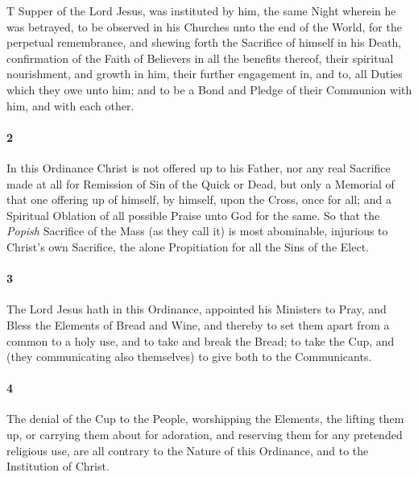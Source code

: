 \documentclass[
    paper=letterpaper,
    11pt,
    twoside,
    DIV=calc,
    openany
]{scrbook}
\makeatletter
\newcommand{\oldgrammar}[2]{#2}
\def\extractfirstletter#1#2@{#1}
\newcommand{\firstlettercommand}[1]{ \extractfirstletter#1@ }
\newcommand{\oldleadin}[2]{\lettrine[ante=\textbf{1},lines=2,lraise=0.1,findent=-0.3em,nindent=0.1em, slope=0em]{\color{red}\firstlettercommand{#2}}{\RemoveFirstLetter{#2}}}
\newcommand{\firstparagraph}{}
\makeatother
\begin{document}
\firstparagraph{} %
\oldleadin{THE}{The} Supper of the Lord Jesus, was instituted by him, the same Night wherein he was betrayed, to be observed in his Churches unto the end of the World, for the perpetual remembrance, and shewing forth the Sacrifice of himself in his Death, \R{}confirmation of the Faith of Believers in all the benefits thereof, their spiritual nourishment, and growth in him, their further \oldgrammar{ingagement}{engagement} in, and to, all Duties which they owe unto him; \R{}and to be a Bond and Pledge of their Communion with him, and with each other.

\footnotebegin
{}
\footnoteend

\paragraph{2} %
In this Ordinance Christ is not offered up to his Father, nor any real Sacrifice made at all for Remission of Sin of the Quick or Dead, but only a Memorial of that \R{}one offering up of himself, by himself, upon the Cross, once for all; and a Spiritual Oblation of all \R{}possible Praise unto God for the same. So that the \textit{Popish} Sacrifice of the Mass (as they call it) is most abominable, injurious to Christ’s own Sacrifice, the alone Propitiation for all the Sins of the Elect.

\footnotebegin
{}
\footnoteend

\paragraph{3} %
The Lord Jesus hath in this Ordinance, appointed his Ministers to Pray, and Bless the Elements of Bread and Wine, and thereby to set them apart from a common to a holy use, and to take and break the Bread; to take the Cup, \R{}and (they communicating also themselves) to give both to the Communicants. 

\footnotebegin
{}
\footnoteend

\paragraph{4} %
The \oldgrammar{denyal}{denial} of the Cup to the People, worshipping the Elements, the lifting them up, or carrying them about for adoration, and reserving them for any pretended religious use, \R{}are all contrary to the Nature of this Ordinance, and to the Institution of Christ.
\end{document}
